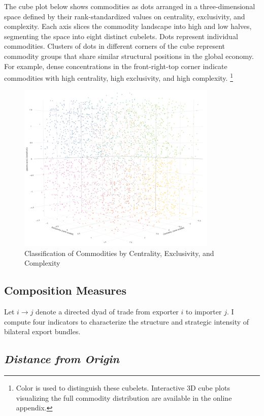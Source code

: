 \documentclass[12pt]{article}
\begin{document}
The cube plot below shows commodities as dots arranged in a three-dimensional space defined by their rank-standardized values on centrality, exclusivity, and complexity. Each axis slices the commodity landscape into high and low halves, segmenting the space into eight distinct cubelets. Dots represent individual commodities. Clusters of dots in different corners of the cube represent commodity groups that share similar structural positions in the global economy. For example, dense concentrations in the front-right-top corner indicate commodities with high centrality, high exclusivity, and high complexity. \footnote{Color is used to distinguish these cubelets. Interactive 3D cube plots visualizing the full commodity distribution are available in the online appendix.}

\begin{figure}[H]
    \centering
    \includegraphics[width=0.85\textwidth]{figures/commodity_cube_plot_2020.png}
    \caption{Classification of Commodities by Centrality, Exclusivity, and Complexity}
    \label{fig:cube_screenshot}
\end{figure}

\subsection{Composition Measures}

Let $i \rightarrow j$ denote a directed dyad of trade from exporter $i$ to importer $j$. I compute four indicators to characterize the structure and strategic intensity of bilateral export bundles.

\subsection*{\textit{Distance from Origin}}
\end{document}
